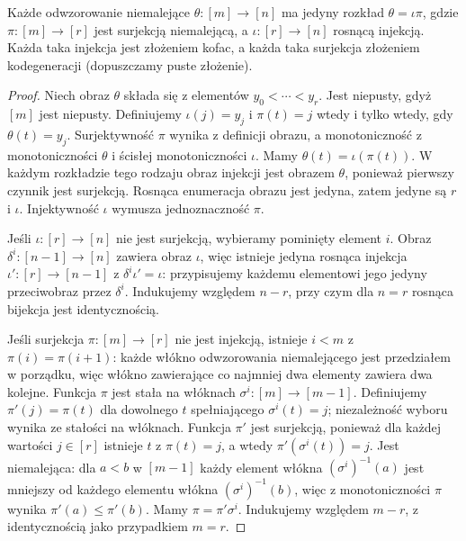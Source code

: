 \begin{center}
\end{center}

\begin{twierdzenie}\label{cat:thm:delta-factorization}
Każde odwzorowanie niemalejące $\theta:[m]\to[n]$ ma jedyny rozkład $\theta=\iota\pi$, gdzie $\pi:[m]\to[r]$ jest surjekcją niemalejącą, a $\iota:[r]\to[n]$ rosnącą injekcją. Każda taka injekcja jest złożeniem kofac, a każda taka surjekcja złożeniem kodegeneracji (dopuszczamy puste złożenie).
\end{twierdzenie}
\begin{proof}
Niech obraz $\theta$ składa się z elementów $y_0<\cdots<y_r$. Jest niepusty, gdyż $[m]$ jest niepusty. Definiujemy $\iota(j)=y_j$ i $\pi(t)=j$ wtedy i tylko wtedy, gdy $\theta(t)=y_j$. Surjektywność $\pi$ wynika z definicji obrazu, a monotoniczność z monotoniczności $\theta$ i ścisłej monotoniczności $\iota$. Mamy $\theta(t)=\iota(\pi(t))$. W każdym rozkładzie tego rodzaju obraz injekcji jest obrazem $\theta$, ponieważ pierwszy czynnik jest surjekcją. Rosnąca enumeracja obrazu jest jedyna, zatem jedyne są $r$ i $\iota$. Injektywność $\iota$ wymusza jednoznaczność $\pi$.

Jeśli $\iota:[r]\to[n]$ nie jest surjekcją, wybieramy pominięty element $i$. Obraz $\delta^i:[n-1]\to[n]$ zawiera obraz $\iota$, więc istnieje jedyna rosnąca injekcja $\iota':[r]\to[n-1]$ z $\delta^i\iota'=\iota$: przypisujemy każdemu elementowi jego jedyny przeciwobraz przez $\delta^i$. Indukujemy względem $n-r$, przy czym dla $n=r$ rosnąca bijekcja jest identycznością.

Jeśli surjekcja $\pi:[m]\to[r]$ nie jest injekcją, istnieje $i<m$ z $\pi(i)=\pi(i+1)$: każde włókno odwzorowania niemalejącego jest przedziałem w porządku, więc włókno zawierające co najmniej dwa elementy zawiera dwa kolejne. Funkcja $\pi$ jest stała na włóknach $\sigma^i:[m]\to[m-1]$. Definiujemy $\pi'(j)=\pi(t)$ dla dowolnego $t$ spełniającego $\sigma^i(t)=j$; niezależność wyboru wynika ze stałości na włóknach. Funkcja $\pi'$ jest surjekcją, ponieważ dla każdej wartości $j\in[r]$ istnieje $t$ z $\pi(t)=j$, a wtedy $\pi'(\sigma^i(t))=j$. Jest niemalejąca: dla $a<b$ w $[m-1]$ każdy element włókna $(\sigma^i)^{-1}(a)$ jest mniejszy od każdego elementu włókna $(\sigma^i)^{-1}(b)$, więc z monotoniczności $\pi$ wynika $\pi'(a)\leq\pi'(b)$. Mamy $\pi=\pi'\sigma^i$. Indukujemy względem $m-r$, z identycznością jako przypadkiem $m=r$.
\end{proof}

